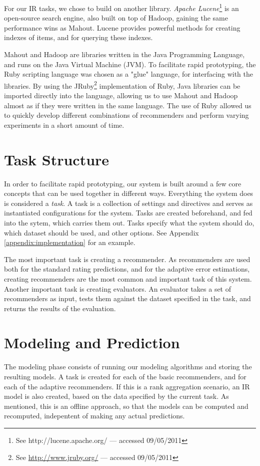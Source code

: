 For our IR tasks, we chose to build on another library.
\emph{Apache Lucene}\footnote{
See http://lucene.apache.org/ --- accessed 09/05/2011} is an open-source search engine, also built on top of Hadoop,
gaining the same performance wins as Mahout.
Lucene provides powerful methods for creating indexes of items, and for querying these indexes.

Mahout and Hadoop are libraries written in the Java Programming Language,
and runs on the Java Virtual Machine (JVM).
To facilitate rapid prototyping, the Ruby scripting language was chosen as a "glue" language,
for interfacing with the libraries. 
By using the JRuby\footnote{
See \url{http://www.jruby.org/} --- accessed 09/05/2011} 
implementation of Ruby, Java libraries can be imported directly
into the language, allowing us to use Mahout and Hadoop almost as if they were written in the same language.
The use of Ruby allowed us to quickly develop different combinations of recommenders and
perform varying experiments in a short amount of time.

\section{Task Structure}

In order to facilitate rapid prototyping,
our system is built around a few core concepts that can
be used together in different ways.
Everything the system does is considered a \emph{task}.
A task is a collection of settings and directives
and serves as instantiated configurations for the system.
Tasks are created beforehand, and fed into the sytem,
which carries them out.
Tasks specify what the system should do,
which dataset should be used, and other options.
See Appendix \ref{appendix:implementation} for an example.

The most important task is creating a recommender.
As recommenders are used both for the standard rating predictions,
and for the adaptive error estimations, creating recommenders
are the most common and important task of this system.
Another important task is creating evaluators.
An evaluator takes a set of recommenders as input,
tests them against the dataset specified in the task,
and returns the results of the evaluation.


\section{Modeling and Prediction}

The modeling phase consists of running our modeling algorithms and storing the resulting models.
A task is created for each of the basic recommenders, and for each of the adaptive recommenders.
If this is a rank aggregation scenario, an IR model is also created, based on the data
specified by the current task.
As mentioned, this is an offline approach, so that the models can be computed and recomputed,
indepentent of making any actual predictions.

